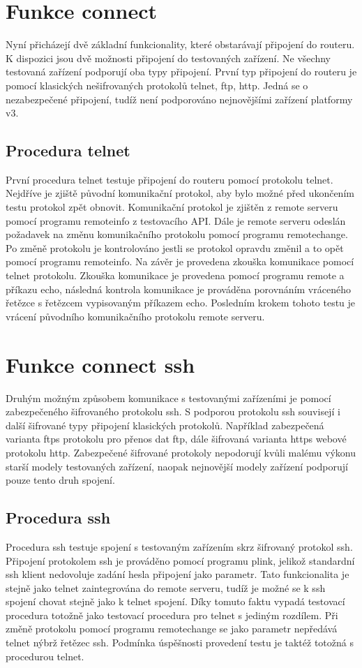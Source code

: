 \section{Funkce connect}
Nyní přicházejí dvě základní funkcionality, které obstarávají připojení do routeru. K dispozici jsou dvě možnosti připojení do testovaných zařízení. Ne všechny testovaná zařízení podporují oba typy připojení. První typ připojení do routeru je pomocí klasických nešifrovaných protokolů telnet, ftp, http. Jedná se o nezabezpečené připojení, tudíž není podporováno nejnovějšími zařízení platformy v3.

\subsection{Procedura telnet}
První procedura telnet testuje připojení do routeru pomocí protokolu telnet. Nejdříve je zjiště původní komunikační protokol, aby bylo možné před ukončením testu protokol zpět obnovit. Komunikační protokol je zjištěn z remote serveru pomocí programu remoteinfo z testovacího API. Dále je remote serveru odeslán požadavek na změnu komunikačního protokolu pomocí programu remotechange. Po změně protokolu je kontrolováno jestli se protokol opravdu změnil a to opět pomocí programu remoteinfo. Na závěr je provedena zkouška komunikace pomocí telnet protokolu. Zkouška komunikace je provedena pomocí programu remote a příkazu echo, následná kontrola komunikace je prováděna porovnáním vráceného řetězce s řetězcem vypisovaným příkazem echo. Posledním krokem tohoto testu je vrácení původního komunikačního protokolu remote serveru.

\section{Funkce connect ssh}
Druhým možným způsobem komunikace s testovanými zařízeními je pomocí zabezpečeného šifrovaného protokolu ssh. S podporou protokolu ssh souvisejí i další šifrované typy připojení klasických protokolů. Například zabezpečená varianta ftps protokolu pro přenos dat ftp, dále šifrovaná varianta https webové protokolu http. Zabezpečené šifrované protokoly nepodorují kvůli malému výkonu starší modely testovaných zařízení, naopak nejnovější modely zařízení podporují pouze tento druh spojení.

\subsection{Procedura ssh}
Procedura ssh testuje spojení s testovaným zařízením skrz šifrovaný protokol ssh. Připojení protokolem ssh je prováděno pomocí programu plink, jelikož standardní ssh klient nedovoluje zadání hesla připojení jako parametr. Tato funkcionalita je stejně jako telnet zaintegrována do remote serveru, tudíž je možné se k ssh spojení chovat stejně jako k telnet spojení. Díky tomuto faktu vypadá testovací procedura totožně jako testovací procedura pro telnet s jediným rozdílem. Při změně protokolu pomocí programu remotechange se jako parametr nepředává telnet nýbrž řetězec ssh. Podmínka úspěšnosti provedení testu je taktéž totožná s procedurou telnet.

